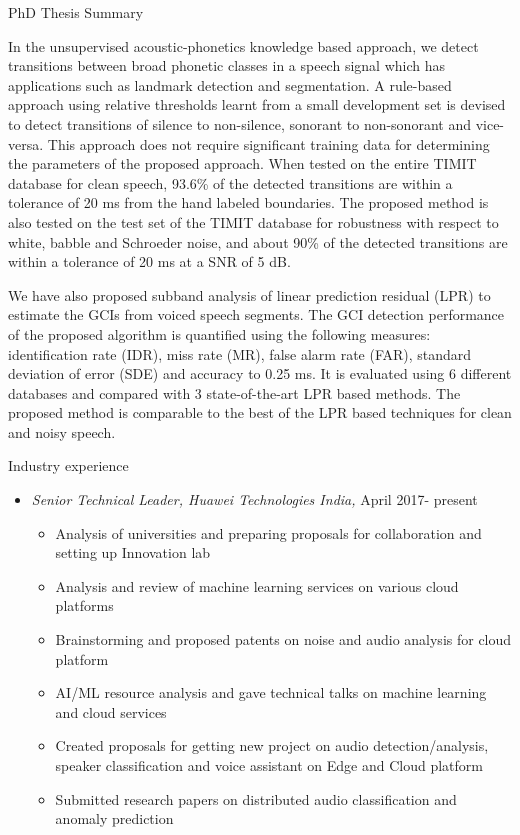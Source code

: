 \documentclass[10pt]{article}
\begin{document}
\begin{cv}
\begin{cvlist}{PhD Thesis Summary}
    
    	
    	
    	In the unsupervised acoustic-phonetics knowledge based approach, we detect
    	transitions between broad phonetic classes in a speech signal which has
    	applications such as landmark detection and segmentation. A rule-based
    	approach using relative thresholds learnt from a small development set is
    	devised to detect transitions of silence to non-silence, sonorant to
    	non-sonorant and vice-versa. This approach does not require significant
    	training data for determining the parameters of the proposed approach. When
    	tested on the entire TIMIT database for clean speech, 93.6\% of the detected
    	transitions are within a tolerance of 20 ms from the hand labeled
    	boundaries. The proposed method is also tested on the test set of the TIMIT
    	database for robustness with respect to white, babble and Schroeder noise,
    	and about 90\% of the detected transitions are within a tolerance of 20 ms
    	at a SNR of 5 dB. 
    	
    	We have also proposed subband analysis of linear prediction
    	residual (LPR) to estimate the GCIs from voiced speech segments. The GCI detection performance of the proposed algorithm is quantified using the following measures: identification rate (IDR), miss rate (MR), false alarm rate (FAR), standard deviation of error (SDE) and accuracy to 0.25 ms. It is evaluated using 6 different
    	databases and compared with 3 state-of-the-art LPR based methods. The
    	proposed method is comparable to the best of the LPR based techniques for
    	clean and noisy speech.
    	

\end{cvlist}

\begin{cvlist}{Industry experience}\item
\begin{itemize}\itemsep=0.25em
\item \emph{Senior Technical Leader, Huawei Technologies India,} April 2017- present

\begin{itemize}
\item Analysis of universities and preparing proposals for collaboration and setting up Innovation lab
\item Analysis and review of machine learning services on various cloud platforms
\item Brainstorming and  proposed patents on noise and audio analysis for cloud platform
\item  AI/ML resource analysis and gave technical talks on machine learning and cloud services
\item  Created proposals for getting new project on audio detection/analysis, speaker classification and voice assistant on Edge and Cloud platform
\item Submitted research papers on distributed audio classification  and anomaly prediction
\end{itemize}


\end{itemize}
\end{cvlist}
\end{cv}
\end{document}
